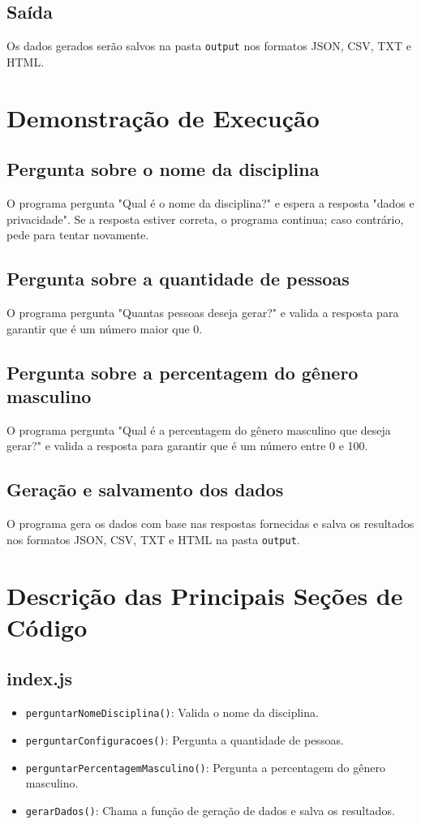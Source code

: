\documentclass{article}
\begin{document}
\subsection{Saída}
Os dados gerados serão salvos na pasta \texttt{output} nos formatos JSON, CSV, TXT e HTML.

\section{Demonstração de Execução}

\subsection{Pergunta sobre o nome da disciplina}
O programa pergunta "Qual é o nome da disciplina?" e espera a resposta "dados e privacidade". Se a resposta estiver correta, o programa continua; caso contrário, pede para tentar novamente.

\subsection{Pergunta sobre a quantidade de pessoas}
O programa pergunta "Quantas pessoas deseja gerar?" e valida a resposta para garantir que é um número maior que 0.

\subsection{Pergunta sobre a percentagem do gênero masculino}
O programa pergunta "Qual é a percentagem do gênero masculino que deseja gerar?" e valida a resposta para garantir que é um número entre 0 e 100.

\subsection{Geração e salvamento dos dados}
O programa gera os dados com base nas respostas fornecidas e salva os resultados nos formatos JSON, CSV, TXT e HTML na pasta \texttt{output}.

\section{Descrição das Principais Seções de Código}

\subsection{index.js}
\begin{itemize}
    \item \texttt{perguntarNomeDisciplina()}: Valida o nome da disciplina.
    \item \texttt{perguntarConfiguracoes()}: Pergunta a quantidade de pessoas.
    \item \texttt{perguntarPercentagemMasculino()}: Pergunta a percentagem do gênero masculino.
    \item \texttt{gerarDados()}: Chama a função de geração de dados e salva os resultados.
\end{itemize}
\end{document}
